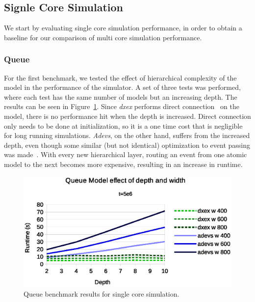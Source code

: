 \subsection{Signle Core Simulation}
We start by evaluating single core simulation performance, in order to obtain a baseline for our comparison of multi core simulation performance.

\subsubsection{Queue}
\label{4-seq-Queue}
For the first benchmark, we tested the effect of hierarchical complexity of the model in the performance of the simulator.
A set of three tests was performed, where each test has the same number of models but an increasing depth.
The results can be seen in Figure~\ref{fig:Queue_benchmark_seq}.
Since \textit{dxex} performs direct connection~\cite{SymbolicFlattening} on the model, there is no performance hit when the depth is increased.
Direct connection only needs to be done at initialization, so it is a one time cost that is negligible for long running simulations.
\textit{Adevs}, on the other hand, suffers from the increased depth, even though some similar (but not identical) optimization to event passing was made~\cite{adevs_opt}.
With every new hierarchical layer, routing an event from one atomic model to the next becomes more expensive, resulting in an increase in runtime.

\begin{figure}
	\center
	\includegraphics[width=\columnwidth]{fig/queue_fixed_sequential.eps}
	\caption{Queue benchmark results for single core simulation.}
	\label{fig:Queue_benchmark_seq}
\end{figure}

